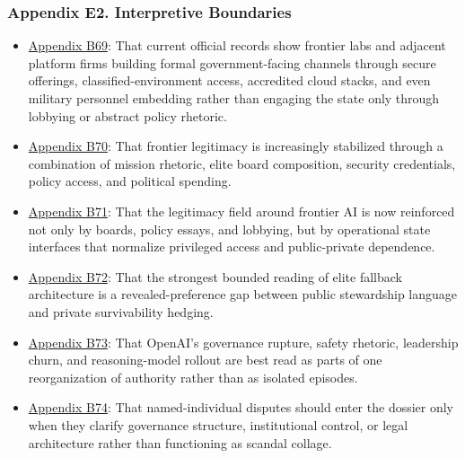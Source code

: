 \documentclass[
  american,
  11pt,
  letterpaper,
]{article}
\providecommand{\tightlist}{%
  \setlength{\itemsep}{0pt}\setlength{\parskip}{0pt}}
\begin{document}
\subsubsection{Appendix E2. Interpretive
Boundaries}\label{ch-08-appendix-e2-interpretive-boundaries}

\begin{itemize}
\tightlist
\item
  \hyperref[ch-08-appendix-b69-current-official-records-show-frontier-labs-and-adjacent-platform-firms-building]{Appendix
  B69}: That current official records show frontier labs and adjacent
  platform firms building formal government-facing channels through
  secure offerings, classified-environment access, accredited cloud
  stacks, and even military personnel embedding rather than engaging the
  state only through lobbying or abstract policy rhetoric.
\item
  \hyperref[ch-08-appendix-b70-frontier-legitimacy-is-increasingly-stabilized-through-a-combination-of-mission-r]{Appendix
  B70}: That frontier legitimacy is increasingly stabilized through a
  combination of mission rhetoric, elite board composition, security
  credentials, policy access, and political spending.
\item
  \hyperref[ch-08-appendix-b71-the-legitimacy-field-around-frontier-ai-is-now-reinforced-not-only-by-boards-pol]{Appendix
  B71}: That the legitimacy field around frontier AI is now reinforced
  not only by boards, policy essays, and lobbying, but by operational
  state interfaces that normalize privileged access and public-private
  dependence.
\item
  \hyperref[ch-08-appendix-b72-the-strongest-bounded-reading-of-elite-fallback-architecture-is-a-revealed-prefer]{Appendix
  B72}: That the strongest bounded reading of elite fallback
  architecture is a revealed-preference gap between public stewardship
  language and private survivability hedging.
\item
  \hyperref[ch-08-appendix-b73-openai-s-governance-rupture-safety-rhetoric-leadership-churn-and-reasoning-mod]{Appendix
  B73}: That OpenAI's governance rupture, safety rhetoric, leadership
  churn, and reasoning-model rollout are best read as parts of one
  reorganization of authority rather than as isolated episodes.
\item
  \hyperref[ch-08-appendix-b74-named-individual-disputes-should-enter-the-dossier-only-when-they-clarify-governa]{Appendix
  B74}: That named-individual disputes should enter the dossier only
  when they clarify governance structure, institutional control, or
  legal architecture rather than functioning as scandal collage.
\end{itemize}
\end{document}
